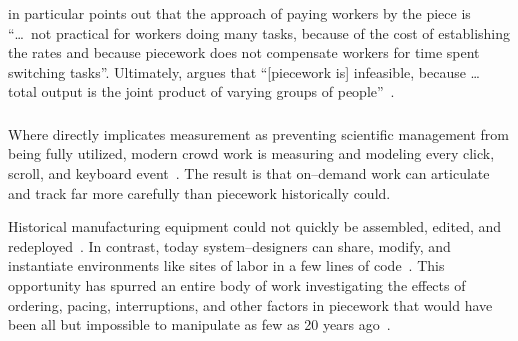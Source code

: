 \documentclass[trackingWork]{subfiles}
\begin{document}
\citeauthor{bewley1999wages} in particular points out that
the approach of paying workers by the piece is
``\dots~not practical for workers doing many tasks, because of
the cost of establishing the rates and because
piecework does not compensate workers for time spent switching tasks''.
Ultimately, \citeauthor{bewley1999wages} argues that
``[piecework is] infeasible, because \dots
total output is the joint product of varying groups of people''~\cite{bewley1999wages}.


\subsubsection{\whatchanged}
\begin{comment}
outline
	- measurement is more precise, so decomposition is deeper
	- not a single position, but a marketplace
\end{comment}

Where \citeauthor{10.2307/23702539} directly implicates measurement as
preventing scientific management from being fully utilized,
modern crowd work is measuring and modeling every click, scroll, and keyboard event~\cite{rzeszotarski2011instrumenting,rzeszotarski2012crowdscape}.
The result is that on--demand work can articulate and track far more carefully than piecework historically could.

Historical manufacturing equipment could not quickly be assembled, edited, and redeployed~\cite{hu1961parallel}.
In contrast, today system--designers can share, modify, and instantiate environments
like sites of labor in a few lines of code~\cite{lessig2006code,turkitLittle}.
This opportunity has spurred an entire body of work investigating the effects of
ordering,
pacing,
interruptions, and
other factors in piecework that would have been
all but impossible to manipulate as few as 20 years ago~\cite{dai2015and,Cai:2016:CRI:2858036.2858237,cheng2015break,measuringCrowdsourcingCheng,embracingErrorKrishna}.
 
\end{document}
